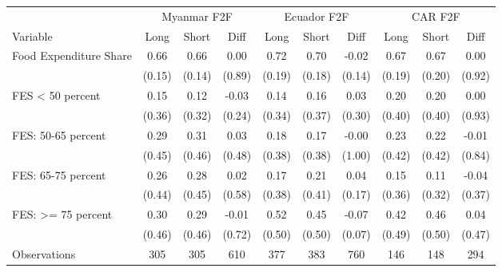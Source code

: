 \begin{tabular}{l*{9}c}
\hline\hline
 & \multicolumn{3}{c}{Myanmar F2F} & \multicolumn{3}{c}{Ecuador F2F} & \multicolumn{3}{c}{CAR F2F}\\ 
Variable & Long & Short & Diff & Long & Short & Diff & Long & Short & Diff \\
\hline
Food Expenditure Share&0.66&0.66&0.00&0.72&0.70&-0.02&0.67&0.67&0.00\\
&(0.15)&(0.14)&(0.89)&(0.19)&(0.18)&(0.14)&(0.19)&(0.20)&(0.92)\\
FES < 50 percent&0.15&0.12&-0.03&0.14&0.16&0.03&0.20&0.20&0.00\\
&(0.36)&(0.32)&(0.24)&(0.34)&(0.37)&(0.30)&(0.40)&(0.40)&(0.93)\\
FES: 50-65 percent&0.29&0.31&0.03&0.18&0.17&-0.00&0.23&0.22&-0.01\\
&(0.45)&(0.46)&(0.48)&(0.38)&(0.38)&(1.00)&(0.42)&(0.42)&(0.84)\\
FES: 65-75 percent&0.26&0.28&0.02&0.17&0.21&0.04&0.15&0.11&-0.04\\
&(0.44)&(0.45)&(0.58)&(0.38)&(0.41)&(0.17)&(0.36)&(0.32)&(0.37)\\
FES: >= 75 percent&0.30&0.29&-0.01&0.52&0.45&-0.07&0.42&0.46&0.04\\
&(0.46)&(0.46)&(0.72)&(0.50)&(0.50)&(0.07)&(0.49)&(0.50)&(0.47)\\
\hline
Observations & 305 & 305 & 610 & 377 & 383 & 760 & 146 & 148 & 294 \\
\hline\hline
\end{tabular}
